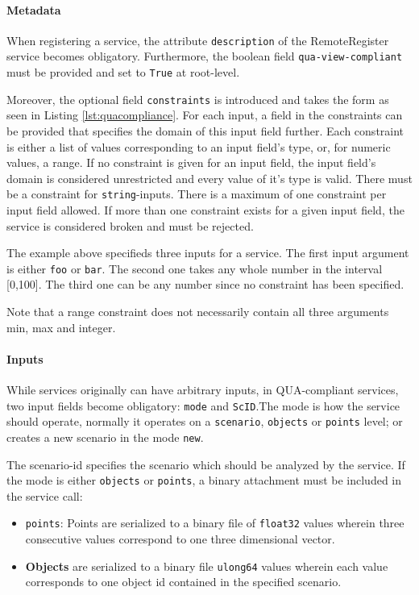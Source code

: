 \paragraph{Metadata}
When registering a service, the attribute \texttt{description} of the RemoteRegister service becomes obligatory. Furthermore, the boolean field \texttt{qua-view-compliant} must be provided and set to \texttt{True} at root-level.

Moreover, the optional field \texttt{constraints} is introduced and takes the form as seen in Listing \ref{lst:quacompliance}.
For each input, a field in the constraints can be provided that specifies the domain of this input field further. Each constraint is either a list of values corresponding to an input field's type, or, for numeric values, a range. If no constraint is given for an input field, the input field's domain is considered unrestricted and every value of it's type is valid. There must be a constraint for \texttt{string}-inputs. There is a maximum of one constraint per input field allowed. If more than one constraint exists for a given input field, the service is considered broken and must be rejected.

The example above specifieds three inputs for a service. The first input argument is either \texttt{foo} or \texttt{bar}. The second one takes any whole number in the interval [0,100]. The third one can be any number since no constraint has been specified.

Note that a range constraint does not necessarily contain all three arguments min, max and integer.

\paragraph{Inputs}
While services originally can have arbitrary inputs, in QUA-compliant services, two input fields become obligatory: \texttt{mode} and \texttt{ScID}.The mode is how the service should operate, normally it operates on a \texttt{scenario}, \texttt{objects} or \texttt{points} level; or creates a new scenario in the mode \texttt{new}.

The scenario-id specifies the scenario which should be analyzed by the service. If the mode is either \texttt{objects} or \texttt{points}, a binary attachment must be included in the service call:
\begin{itemize}
  \item \texttt{points}: Points are serialized to a binary file of \texttt{float32} values wherein three consecutive values correspond to one three dimensional vector.
  \item \textbf{Objects} are serialized to a binary file \texttt{ulong64} values wherein each value corresponds to one object id contained in the specified scenario.
\end{itemize}

